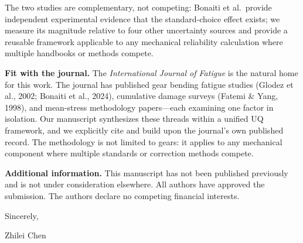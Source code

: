 \documentclass[12pt,a4paper]{article}
\begin{document}
The two studies are complementary, not competing: Bonaiti et al.\ provide
independent experimental evidence that the standard-choice effect exists; we
measure its magnitude relative to four other uncertainty sources and provide
a reusable framework applicable to any mechanical reliability calculation
where multiple handbooks or methods compete.

\vspace{0.3cm}
\noindent\textbf{Fit with the journal.}
The \textit{International Journal of Fatigue} is the natural home for this
work. The journal has published gear bending fatigue studies (Glodez et al.,
2002; Bonaiti et al., 2024), cumulative damage surveys (Fatemi \& Yang, 1998),
and mean-stress methodology papers---each examining one factor in
isolation. Our manuscript synthesizes these threads within a unified UQ
framework, and we explicitly cite and build upon the journal's own
published record. The methodology is not limited to gears: it applies to
any mechanical component where multiple standards or correction methods
compete.

\vspace{0.3cm}
\noindent\textbf{Additional information.}
This manuscript has not been published previously and is not under
consideration elsewhere. All authors have approved the submission. The
authors declare no competing financial interests.

\vspace{1cm}
\noindent Sincerely,

\vspace{1.5cm}
\noindent Zhilei Chen
\end{document}
